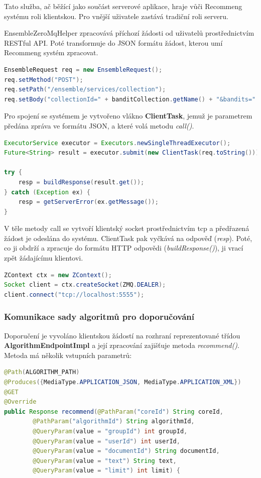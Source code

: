 \documentclass[thesis=M,czech]{FITthesis}[2014/05/07]
\begin{document}
Tato služba, ač běžící jako součást serverové aplikace, hraje vůči Recommeng systému roli klientskou. Pro vnější uživatele zastává tradiční roli serveru.

EnsembleZeroMqHelper zpracovává příchozí žádosti od uživatelů prostřednictvím RESTful API. Poté transformuje do JSON formátu žádost, kterou umí Recommeng systém zpracovat. 

\begin{lstlisting}[language=java]
EnsembleRequest req = new EnsembleRequest();
req.setMethod("POST");
req.setPath("/ensemble/services/collection");
req.setBody("collectionId=" + banditCollection.getName() + "&bandits=" + formatBanditIds(banditCollection.getBanditIds()));
\end{lstlisting}

Pro spojení se systémem je vytvořeno vlákno \textbf{ClientTask}, jemuž je parametrem předána zpráva ve formátu JSON, a které volá metodu \emph{call()}.

\begin{lstlisting}[language=java]
ExecutorService executor = Executors.newSingleThreadExecutor();
Future<String> result = executor.submit(new ClientTask(req.toString()));

try {
    resp = buildResponse(result.get());
} catch (Exception ex) {
    resp = getServerError(ex.getMessage());
}
\end{lstlisting}

V těle metody call se vytvoří klientský socket prostřednictvím tcp a předřazená žádost je odeslána do systému. ClientTask pak vyčkává na odpověď (\emph{resp}). Poté, co ji obdrží a zpracuje do formátu HTTP odpovědi (\emph{buildResponse()}), ji vrací zpět žádajícímu klientovi. 

\begin{lstlisting}[language=java]
ZContext ctx = new ZContext();
Socket client = ctx.createSocket(ZMQ.DEALER);
client.connect("tcp://localhost:5555");
\end{lstlisting}

\subsubsection{Komunikace sady algoritmů pro doporučování}
\label{sec:algcom}
Doporučení je vyvoláno klientskou žádostí na rozhraní reprezentované třídou \textbf{AlgorithmEndpointImpl} a její zpracování zajišťuje metoda \emph{recommend()}. Metoda má několik vstupních parametrů:

\begin{lstlisting}[language=java]
@Path(ALGORITHM_PATH)
@Produces({MediaType.APPLICATION_JSON, MediaType.APPLICATION_XML})
@GET
@Override
public Response recommend(@PathParam("coreId") String coreId,
        @PathParam("algorithmId") String algorithmId,
        @QueryParam(value = "groupId") int groupId,
        @QueryParam(value = "userId") int userId,
        @QueryParam(value = "documentId") String documentId,
        @QueryParam(value = "text") String text,
        @QueryParam(value = "limit") int limit) {
\end{lstlisting}
\end{document}
